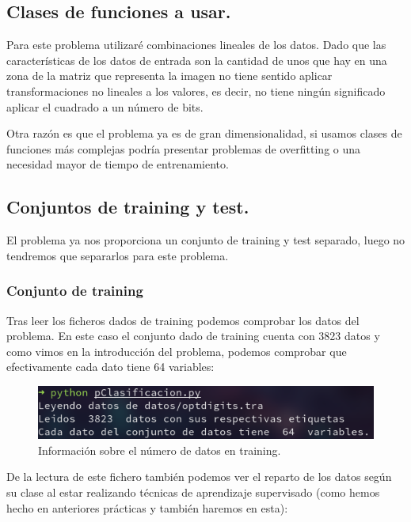 \documentclass[12pt, spanish]{article}
\begin{document}
\subsection{Clases de funciones a usar.}

Para este problema utilizaré combinaciones lineales de los datos. Dado que las características de los datos de entrada son la cantidad de unos que hay en una zona de la matriz que representa la imagen no tiene sentido aplicar transformaciones no lineales a los valores, es decir, no tiene ningún significado aplicar el cuadrado a un número de bits.

Otra razón es que el problema ya es de gran dimensionalidad, si usamos clases de funciones más complejas podría presentar problemas de overfitting o una necesidad mayor de tiempo de entrenamiento.

\subsection{Conjuntos de training y test.}

El problema ya nos proporciona un conjunto de training y test separado, luego no tendremos que separarlos para este problema.

\subsubsection{Conjunto de training}

Tras leer los ficheros dados de training podemos comprobar los datos del problema. En este caso el conjunto dado de training cuenta con 3823 datos y como vimos en la introducción del problema, podemos comprobar que efectivamente cada dato tiene 64 variables:

\begin{figure}[H]
	\centering
	\includegraphics[scale=0.7]{clasificacion/num_datos.png}
	\caption{Información sobre el número de datos en training.}
	\label{datosClasificacion}
\end{figure}

De la lectura de este fichero también podemos ver el reparto de los datos según su clase al estar realizando técnicas de aprendizaje supervisado (como hemos hecho en anteriores prácticas y también haremos en esta):
\end{document}
